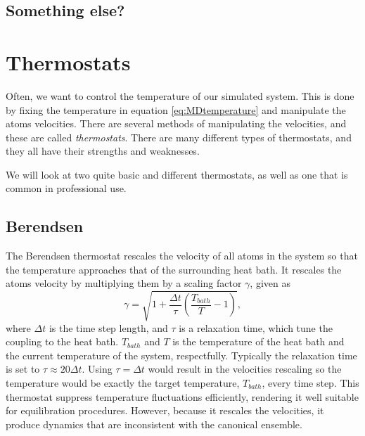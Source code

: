 \documentclass[twoside,english]{uiofysmaster}
\newcommand\lr[1]{\left(#1\right)}
\begin{document}
\subsection{Something else?}

\section{Thermostats}\label{sec:thermostats}
Often, we want to control the temperature of our simulated system.
This is done by fixing the temperature in equation \eqref{eq:MDtemperature} and manipulate the atoms velocities.
There are several methods of manipulating the velocities, and these are called \textit{thermostats}. 
There are many different types of thermostats, and they all have their strengths and weaknesses.

We will look at two quite basic and different thermostats, as well as one that is common in professional use.   


\subsection{Berendsen}
The Berendsen thermostat rescales the velocity of all atoms in the system so that the temperature approaches that of the surrounding heat bath.
It rescales the atoms velocity by multiplying them by a scaling factor $\gamma$, given as 
\begin{equation}
\gamma = \sqrt{1+\frac{\Delta t}{\tau}\lr{\frac{T_{bath}}{T}-1}},
\end{equation}
where $\Delta t$ is the time step length, and $\tau$ is a relaxation time, which tune the coupling to the heat bath. 
$T_{bath}$ and $T$ is the temperature of the heat bath and the current temperature of the system, respectfully.
Typically the relaxation time is set to $\tau \approx 20\Delta t$. 
Using $\tau = \Delta t$ would result in the velocities rescaling so the temperature would be exactly the target temperature, $T_{bath}$, every time step. 
This thermostat suppress temperature fluctuations efficiently, rendering it well suitable for equilibration procedures.
However, because it rescales the velocities, it produce dynamics that are inconsistent with the canonical ensemble.
\end{document}
